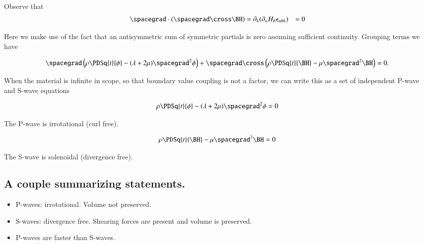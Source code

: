 Observe that
\begin{align*}
\spacegrad \cdot (\spacegrad \cross \BH) 
&=
\partial_k (\partial_a H_b \epsilon_{abk})
&=
0
\end{align*}

Here we make use of the fact that an antisymmetric sum of symmetric partials is zero assuming sufficient continuity.  Grouping terms we have

\begin{equation}\label{eqn:continuumL7:450}
\spacegrad 
\left(
\rho \PDSq{t}{\phi} - (\lambda + 2\mu) \spacegrad^2 \phi
\right)
+ 
\spacegrad \cross 
\left(
\rho \PDSq{t}{\BH} - \mu \spacegrad^2 \BH
\right)
= 0.
\end{equation}

When the material is infinite in scope, so that boundary value coupling is not a factor, we can write this as a set of independent P-wave and S-wave equations

\begin{equation}\label{eqn:continuumL7:470}
\rho \PDSq{t}{\phi} - (\lambda + 2\mu) \spacegrad^2 \phi = 0
\end{equation}

The P-wave is irrotational (curl free).

\begin{equation}\label{eqn:continuumL7:490}
\rho \PDSq{t}{\BH} - \mu \spacegrad^2 \BH = 0
\end{equation}

The S-wave is solenoidal (divergence free).

\subsection{A couple summarizing statements.}

\begin{itemize}
\item 
P-waves: irrotational.  Volume not preserved.
\item 
S-waves: divergence free.  Shearing forces are present and volume is preserved.
\item 
P-waves are faster than S-waves.
\end{itemize}

\EndArticle
